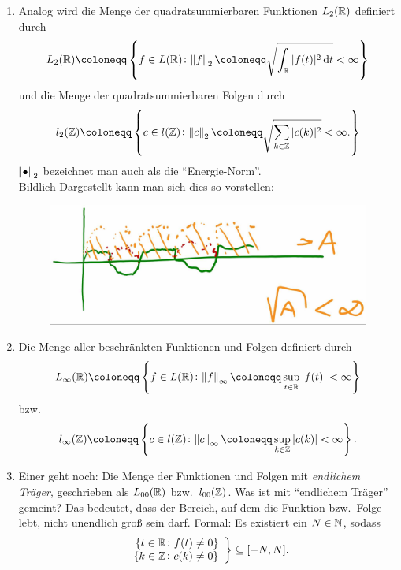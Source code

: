 \begin{definition}[Funktionenräume]
\begin{enumerate}
\item Analog wird die Menge der quadratsummierbaren Funktionen $ L_{2}(\mathbb{R}) $ definiert durch
\[ 
  L_{2}(\R) \coloneqq \left\{
    f \in L(\R) \colon \norm{f}_{2} \coloneqq \sqrt{ \int_{\R} |f(t)|^{2} \dif t } < \infty
  \right\}
\]
und die Menge der quadratsummierbaren Folgen durch
\[ 
  l_{2}(\Z) \coloneqq \left\{
    c \in l(\Z) \colon \norm{c}_{2} \coloneqq \sqrt{ \sum_{k \in \Z} |c(k)|^{2} } < \infty.
  \right\}
\]
$ \norm{\bullet}_{2} $ bezeichnet man auch als die \enquote{Energie-Norm}.\\
Bildlich Dargestellt kann man sich dies so vorstellen:
\begin{figure}[h]
	\centering
	\includegraphics[width=0.5\linewidth]{Bilder/L2}
	\caption{}
	\label{fig:L1}
\end{figure}
\item Die Menge aller beschränkten Funktionen und Folgen definiert durch
\[
  L_{\infty}(\R) \coloneqq \left\{
    f \in L(\R) \colon \norm{f}_{\infty} \coloneqq
      \sup_{t \in \R} |f(t)| < \infty
  \right\}
\]
bzw.
\[
  l_{\infty}(\Z) \coloneqq \left\{
    c \in l(\Z) \colon \norm{c}_{\infty} \coloneqq
      \sup_{k \in \Z} |c(k)| < \infty
  \right\}.
\]
\item Einer geht noch: Die Menge der Funktionen und Folgen mit \emph{endlichem Träger}, geschrieben
als $ L_{00}(\mathbb{R}) $ bzw.\ $ l_{00}(\mathbb{Z}) $. Was ist mit \enquote{endlichem Träger} gemeint? Das 
bedeutet, dass der Bereich, auf dem die Funktion bzw.\ Folge lebt, nicht unendlich groß sein darf.
Formal: Es existiert ein $ N \in \mathbb{N} $, sodass
\[
  \left.
  \begin{array}{r}
    \{ t \in \mathbb{R} \colon f(t) \neq 0 \} \\
    \{ k \in \mathbb{Z} \colon c(k) \neq 0 \}
  \end{array}
  \right\}
  \subseteq [-N, N].
\]
\end{enumerate}
\end{definition}

